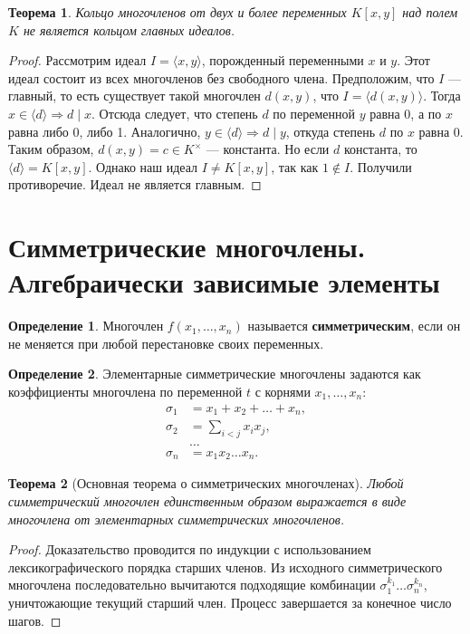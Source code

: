 \documentclass[12pt, a4paper]{article}
\newtheorem{theorem}{Теорема}
\theoremstyle{definition}
\newtheorem{definition}{Определение}
\theoremstyle{remark}
\begin{document}
\begin{theorem}
	Кольцо многочленов от двух и более переменных $K[x, y]$ над полем $K$ не является кольцом главных идеалов.
\end{theorem}
\begin{proof}
	Рассмотрим идеал $I = \langle x, y \rangle$, порожденный переменными $x$ и $y$. Этот идеал состоит из всех многочленов без свободного члена. 
	Предположим, что $I$ — главный, то есть существует такой многочлен $d(x,y)$, что $I = \langle d(x,y) \rangle$.
	Тогда $x \in \langle d \rangle \Rightarrow d \mid x$. Отсюда следует, что степень $d$ по переменной $y$ равна 0, а по $x$ равна либо 0, либо 1.
	Аналогично, $y \in \langle d \rangle \Rightarrow d \mid y$, откуда степень $d$ по $x$ равна 0.
	Таким образом, $d(x,y) = c \in K^{\times}$ — константа. Но если $d$ константа, то $\langle d \rangle = K[x,y]$. Однако наш идеал $I \neq K[x,y]$, так как $1 \notin I$. Получили противоречие. Идеал не является главным.
\end{proof}

\section{Симметрические многочлены. Алгебраически зависимые элементы}

\begin{definition}
	Многочлен $f(x_1, \dots, x_n)$ называется \textbf{симметрическим}, если он не меняется при любой перестановке своих переменных.
\end{definition}

\begin{definition}
	Элементарные симметрические многочлены задаются как коэффициенты многочлена по переменной $t$ с корнями $x_1, \dots, x_n$:
	\begin{align*}
		\sigma_1 &= x_1 + x_2 + \dots + x_n, \\
		\sigma_2 &= \sum_{i < j} x_i x_j, \\
		&\dots \\
		\sigma_n &= x_1 x_2 \dots x_n.
	\end{align*}
\end{definition}

\begin{theorem}[Основная теорема о симметрических многочленах]
	Любой симметрический многочлен единственным образом выражается в виде многочлена от элементарных симметрических многочленов.
\end{theorem}
\begin{proof}
	Доказательство проводится по индукции с использованием лексикографического порядка старших членов. Из исходного симметрического многочлена последовательно вычитаются подходящие комбинации $\sigma_1^{k_1}\dots\sigma_n^{k_n}$, уничтожающие текущий старший член. Процесс завершается за конечное число шагов.
\end{proof}
\end{document}
